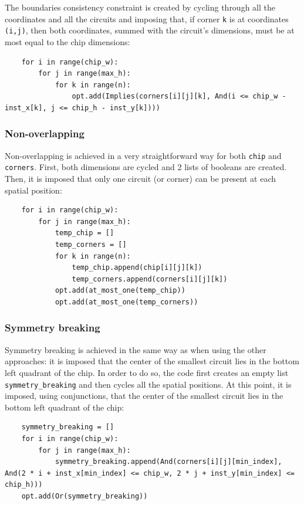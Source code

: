 \documentclass[a4paper, 12pt]{article}
\begin{document}
The boundaries consistency constraint is created by cycling through all the coordinates and all the circuits and imposing that, if corner \verb|k| is at coordinates \verb|(i,j)|, then both coordinates, summed with the circuit's dimensions, must be at most equal to the chip dimensions:
\begin{verbatim}
    for i in range(chip_w):
        for j in range(max_h):
            for k in range(n):
                opt.add(Implies(corners[i][j][k], And(i <= chip_w - inst_x[k], j <= chip_h - inst_y[k])))
\end{verbatim}


\subsubsection{Non-overlapping}

Non-overlapping is achieved in a very straightforward way for both \verb|chip| and \verb|corners|. First, both dimensions are cycled and 2 lists of booleans are created. Then, it is imposed that only one circuit (or corner) can be present at each spatial position:
\begin{verbatim}
    for i in range(chip_w):
        for j in range(max_h):
            temp_chip = []
            temp_corners = []
            for k in range(n):
                temp_chip.append(chip[i][j][k])
                temp_corners.append(corners[i][j][k])
            opt.add(at_most_one(temp_chip))
            opt.add(at_most_one(temp_corners))
\end{verbatim}


\subsubsection{Symmetry breaking}

Symmetry breaking is achieved in the same way as when using the other approaches: it is imposed that the center of the smallest circuit lies in the bottom left quadrant of the chip. In order to do so, the code first creates an empty list \verb|symmetry_breaking| and then cycles all the spatial positions. At this point, it is imposed, using conjunctions, that the center of the smallest circuit lies in the bottom left quadrant of the chip:
\begin{verbatim}
    symmetry_breaking = []
    for i in range(chip_w):
        for j in range(max_h):
            symmetry_breaking.append(And(corners[i][j][min_index], And(2 * i + inst_x[min_index] <= chip_w, 2 * j + inst_y[min_index] <= chip_h)))
    opt.add(Or(symmetry_breaking))
\end{verbatim}
\end{document}
